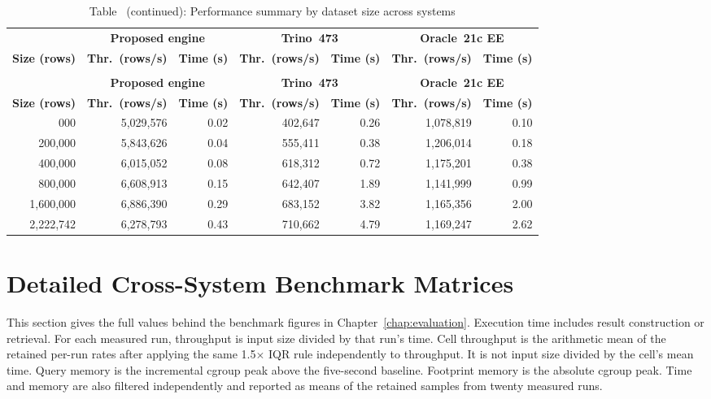 {\scriptsize
\setlength{\tabcolsep}{4pt}
\begin{longtable}{rrrrrrr}
\caption{Performance summary by dataset size across the three systems}
\label{tab:size_summary} \\
\toprule
& \multicolumn{2}{c}{\textbf{Proposed engine}} & \multicolumn{2}{c}{\textbf{Trino~473}} & \multicolumn{2}{c}{\textbf{Oracle~21c EE}} \\
\cmidrule(lr){2-3}\cmidrule(lr){4-5}\cmidrule(lr){6-7}
\textbf{Size (rows)} & \textbf{Thr.\ (rows/s)} & \textbf{Time (s)} & \textbf{Thr.\ (rows/s)} & \textbf{Time (s)} & \textbf{Thr.\ (rows/s)} & \textbf{Time (s)} \\
\midrule
\endfirsthead
\caption*{Table~\thetable{} (continued): Performance summary by dataset size across systems} \\
\toprule
& \multicolumn{2}{c}{\textbf{Proposed engine}} & \multicolumn{2}{c}{\textbf{Trino~473}} & \multicolumn{2}{c}{\textbf{Oracle~21c EE}} \\
\cmidrule(lr){2-3}\cmidrule(lr){4-5}\cmidrule(lr){6-7}
\textbf{Size (rows)} & \textbf{Thr.\ (rows/s)} & \textbf{Time (s)} & \textbf{Thr.\ (rows/s)} & \textbf{Time (s)} & \textbf{Thr.\ (rows/s)} & \textbf{Time (s)} \\
\midrule
\endhead
\bottomrule
\endfoot
100{,}000 & 5{,}029{,}576 & 0.02 & 402{,}647 & 0.26 & 1{,}078{,}819 & 0.10 \\
200{,}000 & 5{,}843{,}626 & 0.04 & 555{,}411 & 0.38 & 1{,}206{,}014 & 0.18 \\
400{,}000 & 6{,}015{,}052 & 0.08 & 618{,}312 & 0.72 & 1{,}175{,}201 & 0.38 \\
800{,}000 & 6{,}608{,}913 & 0.15 & 642{,}407 & 1.89 & 1{,}141{,}999 & 0.99 \\
1{,}600{,}000 & 6{,}886{,}390 & 0.29 & 683{,}152 & 3.82 & 1{,}165{,}356 & 2.00 \\
2{,}222{,}742 & 6{,}278{,}793 & 0.43 & 710{,}662 & 4.79 & 1{,}169{,}247 & 2.62 \\
\end{longtable}
}

\section{Detailed Cross-System Benchmark Matrices}
\label{app:benchmark-matrices}

This section gives the full values behind the benchmark figures in
Chapter~\ref{chap:evaluation}.  Execution time includes result
construction or retrieval.  For each measured run, throughput is input
size divided by that run's time.  Cell throughput is the arithmetic
mean of the retained per-run rates after applying the same
1.5$\times$ IQR rule independently to throughput.  It is not input
size divided by the cell's mean time.  Query memory is the incremental
cgroup peak above the five-second baseline.  Footprint memory is the
absolute cgroup peak.  Time and memory are also filtered independently
and reported as means of the retained samples from twenty measured
runs.

